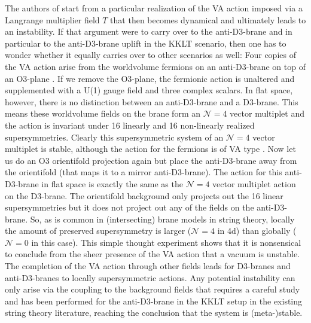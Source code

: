\documentclass[11pt]{article}
\begin{document}
The authors of \cite{DallAgata:2022abm} start from a particular realization of the VA action imposed via a Langrange multiplier field $T$ that then becomes dynamical and ultimately leads to an instability. If that argument were to carry over to the anti-D3-brane and in particular to the anti-D3-brane uplift in the KKLT scenario, then one has to wonder whether it equally carries over to other scenarios as well: Four copies of the VA action arise from the worldvolume fermions on an anti-D3-brane on top of an O3-plane \cite{Kallosh:2014wsa}. If we remove the O3-plane, the fermionic action is unaltered \cite{Kallosh:1997aw} and supplemented with a U(1) gauge field and three complex scalars. In flat space, however, there is no distinction between an anti-D3-brane and a D3-brane. This means these worldvolume fields on the brane form an $\mathcal{N}=4$ vector multiplet and the action is invariant under 16 linearly and 16 non-linearly realized supersymmetries. Clearly this supersymmetric system of an $\mathcal{N}=4$ vector multiplet is stable, although the action for the fermions is of VA type \cite{Kallosh:1997aw}. Now let us do an O3 orientifold projection again but place the anti-D3-brane away from the orientifold (that maps it to a mirror anti-D3-brane). The action for this anti-D3-brane in flat space is exactly the same as the $\mathcal{N}=4$ vector multiplet action on the D3-brane. The orientifold background only projects out the 16 linear supersymmetries but it does not project out any of the fields on the anti-D3-brane. So, as is common in (intersecting) brane models in string theory, locally the amount of preserved supersymmetry is larger ($\mathcal{N}=4$ in 4d) than globally ($\mathcal{N}=0$ in this case). This simple thought experiment shows that it is nonsensical to conclude from the sheer presence of the VA action that a vacuum is unstable. The completion of the VA action through other fields leads for D3-branes and anti-D3-branes to locally supersymmetric actions. Any potential instability can only arise via the coupling to the background fields that requires a careful study and has been performed for the anti-D3-brane in the KKLT setup in the existing string theory literature, reaching the conclusion that the system is (meta-)stable.
\end{document}
